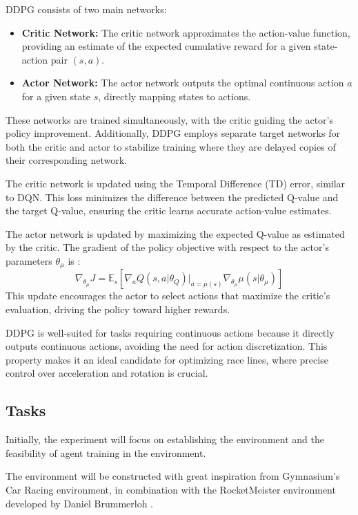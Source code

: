 \documentclass{article}
\begin{document}
DDPG consists of two main networks:
\begin{itemize}
    \item \textbf{Critic Network:} The critic network approximates the action-value function, providing an estimate of the expected cumulative reward for a given state-action pair \((s, a)\).
    \item \textbf{Actor Network:} The actor network outputs the optimal continuous action \(a\) for a given state \(s\), directly mapping states to actions.
\end{itemize}

These networks are trained simultaneously, with the critic guiding the actor's policy improvement. Additionally, DDPG employs separate target networks for both the critic and actor to stabilize training where they are delayed copies of their corresponding network.

The critic network is updated using the Temporal Difference (TD) error, similar to DQN. This loss minimizes the difference between the predicted Q-value and the target Q-value, ensuring the critic learns accurate action-value estimates.

The actor network is updated by maximizing the expected Q-value as estimated by the critic. The gradient of the policy objective with respect to the actor's parameters \(\theta_\mu\) is \cite{lillicrap2015continuous}:
\[
\nabla_{\theta_\mu} J = \mathbb{E}_{s} \left[ \nabla_a Q(s, a| \theta_Q) \big|_{a=\mu(s)} \nabla_{\theta_\mu} \mu(s | \theta_\mu) \right]
\]
This update encourages the actor to select actions that maximize the critic’s evaluation, driving the policy toward higher rewards.

DDPG is well-suited for tasks requiring continuous actions because it directly outputs continuous actions, avoiding the need for action discretization. This property makes it an ideal candidate for optimizing race lines, where precise control over acceleration and rotation is crucial.

\subsection{Tasks}
Initially, the experiment will focus on establishing the environment and the feasibility of agent training in the environment.

The environment will be constructed with great inspiration from Gymnasium's Car Racing environment, in combination with the RocketMeister environment developed by Daniel Brummerloh \cite{rocketmeister2020}.
\end{document}
